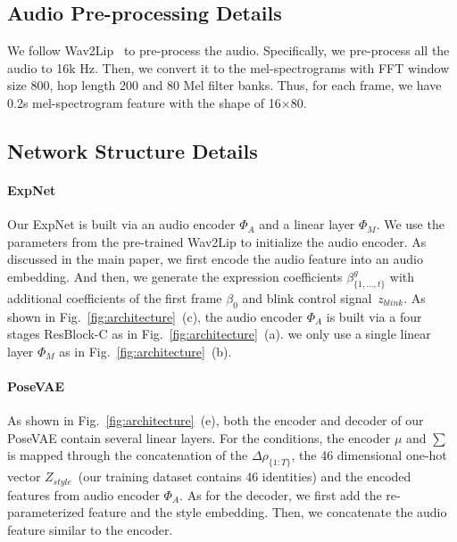 \subsection{Audio Pre-processing Details}
\label{supp:audio}
We follow Wav2Lip~\cite{wav2lip} to pre-process the audio. Specifically, we pre-process all the audio to 16k Hz. Then, we convert it to
the mel-spectrograms with FFT window size 800, hop length
200 and 80 Mel filter banks. Thus, for each frame, we have 0.2s mel-spectrogram feature with the shape of 16$\times$80.

\subsection{Network Structure Details}
\label{supp:network}



\paragraph{ExpNet} Our ExpNet is built via an audio encoder $\Phi_{A}$ and a linear layer $\Phi_{M}$. We use the parameters from the pre-trained Wav2Lip to initialize the audio encoder. As discussed in the main paper, we first encode the audio feature into an audio embedding. And then, we generate the expression coefficients $\beta^g_{\{1,...,t\}}$ with additional coefficients of the first frame $\beta_0$ and blink control signal~$z_{blink}$. As shown in Fig.~\ref{fig:architecture}~(c), the audio encoder $\Phi_{A}$ is built via a four stages ResBlock-C as in Fig.~\ref{fig:architecture}~(a). we only use a single linear layer $\Phi_{M}$ as in Fig.~\ref{fig:architecture}~(b).

\paragraph{PoseVAE} As shown in Fig.~\ref{fig:architecture}~(e), both the encoder and decoder of our PoseVAE contain several linear layers. For the conditions, the encoder $\mu$ and $\sum$ is mapped through the concatenation of the $\Delta \rho_{\{1:T\}}$, the 46 dimensional one-hot vector $Z_{style}$~(our training dataset contains 46 identities) and the encoded features from audio encoder $\Phi_{A}$. As for the decoder, we first add the re-parameterized feature and the style embedding. Then, we concatenate the audio feature similar to the encoder.


